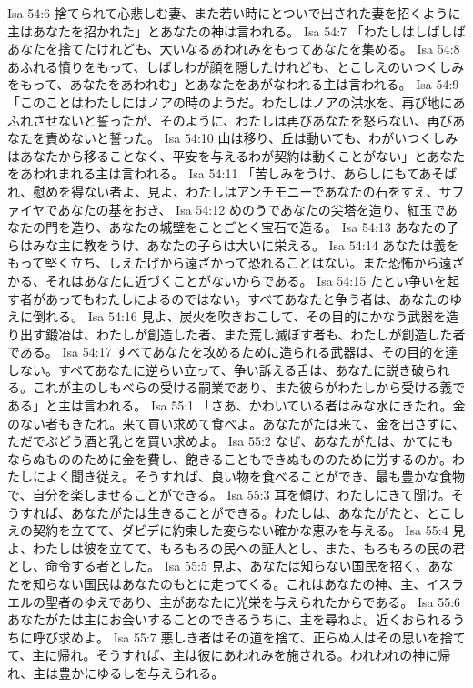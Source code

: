 Isa 54:6  捨てられて心悲しむ妻、また若い時にとついで出された妻を招くように主はあなたを招かれた」とあなたの神は言われる。
Isa 54:7  「わたしはしばしばあなたを捨てたけれども、大いなるあわれみをもってあなたを集める。
Isa 54:8  あふれる憤りをもって、しばしわが顔を隠したけれども、とこしえのいつくしみをもって、あなたをあわれむ」とあなたをあがなわれる主は言われる。
Isa 54:9  「このことはわたしにはノアの時のようだ。わたしはノアの洪水を、再び地にあふれさせないと誓ったが、そのように、わたしは再びあなたを怒らない、再びあなたを責めないと誓った。
Isa 54:10  山は移り、丘は動いても、わがいつくしみはあなたから移ることなく、平安を与えるわが契約は動くことがない」とあなたをあわれまれる主は言われる。
Isa 54:11  「苦しみをうけ、あらしにもてあそばれ、慰めを得ない者よ、見よ、わたしはアンチモニーであなたの石をすえ、サファイヤであなたの基をおき、
Isa 54:12  めのうであなたの尖塔を造り、紅玉であなたの門を造り、あなたの城壁をことごとく宝石で造る。
Isa 54:13  あなたの子らはみな主に教をうけ、あなたの子らは大いに栄える。
Isa 54:14  あなたは義をもって堅く立ち、しえたげから遠ざかって恐れることはない。また恐怖から遠ざかる、それはあなたに近づくことがないからである。
Isa 54:15  たとい争いを起す者があってもわたしによるのではない。すべてあなたと争う者は、あなたのゆえに倒れる。
Isa 54:16  見よ、炭火を吹きおこして、その目的にかなう武器を造り出す鍛冶は、わたしが創造した者、また荒し滅ぼす者も、わたしが創造した者である。
Isa 54:17  すべてあなたを攻めるために造られる武器は、その目的を達しない。すべてあなたに逆らい立って、争い訴える舌は、あなたに説き破られる。これが主のしもべらの受ける嗣業であり、また彼らがわたしから受ける義である」と主は言われる。
Isa 55:1  「さあ、かわいている者はみな水にきたれ。金のない者もきたれ。来て買い求めて食べよ。あなたがたは来て、金を出さずに、ただでぶどう酒と乳とを買い求めよ。
Isa 55:2  なぜ、あなたがたは、かてにもならぬもののために金を費し、飽きることもできぬもののために労するのか。わたしによく聞き従え。そうすれば、良い物を食べることができ、最も豊かな食物で、自分を楽しませることができる。
Isa 55:3  耳を傾け、わたしにきて聞け。そうすれば、あなたがたは生きることができる。わたしは、あなたがたと、とこしえの契約を立てて、ダビデに約束した変らない確かな恵みを与える。
Isa 55:4  見よ、わたしは彼を立てて、もろもろの民への証人とし、また、もろもろの民の君とし、命令する者とした。
Isa 55:5  見よ、あなたは知らない国民を招く、あなたを知らない国民はあなたのもとに走ってくる。これはあなたの神、主、イスラエルの聖者のゆえであり、主があなたに光栄を与えられたからである。
Isa 55:6  あなたがたは主にお会いすることのできるうちに、主を尋ねよ。近くおられるうちに呼び求めよ。
Isa 55:7  悪しき者はその道を捨て、正らぬ人はその思いを捨てて、主に帰れ。そうすれば、主は彼にあわれみを施される。われわれの神に帰れ、主は豊かにゆるしを与えられる。
